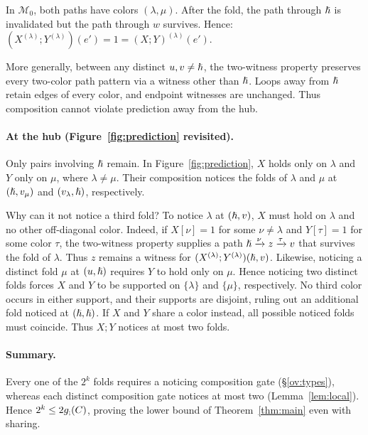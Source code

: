 In $\mathcal M_0$, both paths have colors $(\lambda,\mu)$.
After the fold, the path through $\hslash$ is invalidated but the path through $w$ survives.
Hence:
$(X^{(\lambda)};Y^{(\lambda)})(e')
=1
=(X;Y)^{(\lambda)}(e')$.

More generally, between any distinct $u,v\ne\hslash$, the two-witness
property preserves every two-color path pattern via a witness other
than $\hslash$. Loops away from $\hslash$ retain edges of every color, and
endpoint witnesses are unchanged. Thus composition cannot violate
prediction away from the hub.

\paragraph{At the hub (Figure~\ref{fig:prediction} revisited).}

Only pairs involving $\hslash$ remain.
In Figure~\ref{fig:prediction}, $X$ holds only on $\lambda$ and
$Y$ only on $\mu$, where $\lambda\ne\mu$.
Their composition notices the folds of
$\lambda$ and $\mu$ at $(\hslash,v_\mu)$ and
$(v_\lambda,\hslash)$, respectively.

Why can it not notice a third fold?
To notice $\lambda$ at $(\hslash,v)$, $X$ must
hold on $\lambda$ and no other off-diagonal
color. Indeed, if $X[\nu]=1$ for some
$\nu\ne\lambda$ and $Y[\tau]=1$ for some
color $\tau$, the two-witness property
supplies a path
$\hslash\xrightarrow{\nu}z\xrightarrow{\tau}v$
that survives the fold of $\lambda$.
Thus $z$ remains a witness for
$(X^{(\lambda)};Y^{(\lambda)})(\hslash,v)$.
%
Likewise, noticing a distinct fold $\mu$
at $(u,\hslash)$ requires $Y$ to hold only
on $\mu$. Hence noticing two distinct
folds forces $X$ and $Y$ to be supported
on $\{\lambda\}$ and $\{\mu\}$, respectively.
No third color occurs in either support,
and their supports are disjoint, ruling out
an additional fold noticed at $(\hslash,\hslash)$.
If $X$ and $Y$ share a color instead,
all possible noticed folds must coincide.
Thus $X;Y$ notices at most two folds.

\paragraph{Summary.}
Every one of the $2^k$ folds requires a noticing composition gate
(\S\ref{ov:types}), whereas each distinct composition gate notices at
most two (Lemma~\ref{lem:local}). Hence $2^k\le 2g_{;}(C)$,
proving the lower bound of Theorem~\ref{thm:main} even with sharing.

